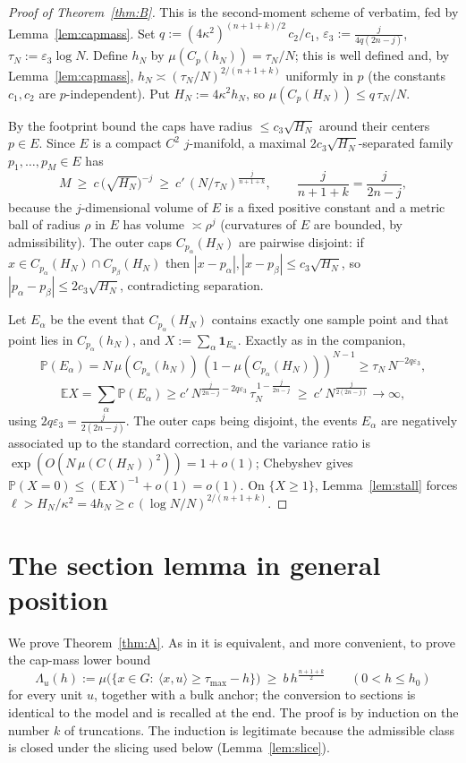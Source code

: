 \documentclass[11pt]{article}
\theoremstyle{definition}
\theoremstyle{remark}
\newcommand{\E}{\mathbb{E}}
\newcommand{\PP}{\mathbb{P}}
\begin{document}
\begin{proof}[Proof of Theorem~\ref{thm:B}]
This is the second-moment scheme of \cite{companion7,companion11} verbatim,
fed by Lemma~\ref{lem:capmass}.  Set
$q:=(4\kappa^2)^{(n+1+k)/2}\,c_2/c_1$,
$\varepsilon_3:=\frac{j}{4q(2n-j)}$, $\tau_N:=\varepsilon_3\log N$.  Define
$h_N$ by $\mu(C_p(h_N))=\tau_N/N$; this is well defined and, by
Lemma~\ref{lem:capmass}, $h_N\asymp(\tau_N/N)^{2/(n+1+k)}$ uniformly in $p$
(the constants $c_1,c_2$ are $p$-independent).  Put $H_N:=4\kappa^2h_N$, so
$\mu(C_p(H_N))\le q\,\tau_N/N$.

By the footprint bound the caps have radius $\le c_3\sqrt{H_N}$ around their
centers $p\in E$.  Since $E$ is a compact $C^2$ $j$-manifold, a maximal
$2c_3\sqrt{H_N}$-separated family $p_1,\dots,p_M\in E$ has
\[
M\ \ge\ c\,\bigl(\sqrt{H_N}\bigr)^{-j}\ \ge\
c'\,(N/\tau_N)^{\frac{j}{n+1+k}},
\qquad \frac{j}{n+1+k}=\frac{j}{2n-j},
\]
because the $j$-dimensional volume of $E$ is a fixed positive constant and a
metric ball of radius $\rho$ in $E$ has volume $\asymp\rho^j$ (curvatures of
$E$ are bounded, by admissibility).  The outer caps $C_{p_\alpha}(H_N)$ are
pairwise disjoint: if $x\in C_{p_\alpha}(H_N)\cap C_{p_\beta}(H_N)$ then
$|x-p_\alpha|,|x-p_\beta|\le c_3\sqrt{H_N}$, so
$|p_\alpha-p_\beta|\le2c_3\sqrt{H_N}$, contradicting separation.

Let $E_\alpha$ be the event that $C_{p_\alpha}(H_N)$ contains exactly one
sample point and that point lies in $C_{p_\alpha}(h_N)$, and
$X:=\sum_\alpha\mathbf1_{E_\alpha}$.  Exactly as in the companion,
\[
\PP(E_\alpha)=N\,\mu(C_{p_\alpha}(h_N))\,(1-\mu(C_{p_\alpha}(H_N)))^{N-1}
\ge\tau_N\,N^{-2q\varepsilon_3},
\]
\[
\E X=\sum_\alpha\PP(E_\alpha)\ge c'\,N^{\frac j{2n-j}-2q\varepsilon_3}\,
\tau_N^{\,1-\frac j{2n-j}}\ \ge\ c'\,N^{\frac{j}{2(2n-j)}}\to\infty,
\]
using $2q\varepsilon_3=\frac{j}{2(2n-j)}$.  The outer caps being disjoint, the
events $E_\alpha$ are negatively associated up to the standard correction, and
the variance ratio is $\exp(O(N\,\mu(C(H_N))^2))=1+o(1)$; Chebyshev gives
$\PP(X=0)\le(\E X)^{-1}+o(1)=o(1)$.  On $\{X\ge1\}$, Lemma~\ref{lem:stall}
forces $\ell>H_N/\kappa^2=4h_N\ge c\,(\log N/N)^{2/(n+1+k)}$.
\end{proof}

\section{The section lemma in general position}\label{sec:section}

We prove Theorem~\ref{thm:A}.  As in \cite{companion11} it is equivalent, and
more convenient, to prove the cap-mass lower bound
\begin{equation}\label{eq:capgoal}
\Lambda_u(h):=\mu\bigl(\{x\in G:\ \langle x,u\rangle\ge\tau_{\max}-h\}\bigr)
\ \ge\ b\,h^{\frac{n+1+k}2}
\qquad(0<h\le h_0)
\end{equation}
for every unit $u$, together with a bulk anchor; the conversion to sections is
identical to the model and is recalled at the end.  The proof is by induction
on the number $k$ of truncations.  The induction is legitimate because the
admissible class is closed under the slicing used below
(Lemma~\ref{lem:slice}).
\end{document}
